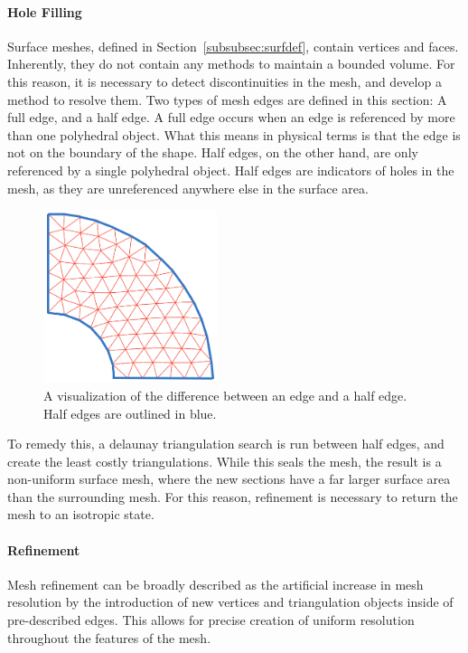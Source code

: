 \documentclass[12pt]{drexelthesis}
\begin{document}
\paragraph{Hole Filling}
Surface meshes, defined in Section~\ref{subsubsec:surfdef}, contain vertices and faces. Inherently, they do not contain any methods to maintain a bounded volume. For this reason, it is necessary to detect discontinuities in the mesh, and develop a method to resolve them. Two types of mesh edges are defined in this section: A full edge, and a half edge.
A full edge occurs when an edge is referenced by more than one polyhedral object. What this means in physical terms is that the edge is not on the boundary of the shape. Half edges, on the other hand, are only referenced by a single polyhedral object. Half edges are indicators of holes in the mesh, as they are unreferenced anywhere else in the surface area.

\begin{figure}[!ht]
	\centering
		\includegraphics[width=2in]{edgevshalfedge.png}
		\caption[Example of an edge vs. a half edge]{\centering A visualization of the difference between an edge and a half edge. Half edges are outlined in blue.}
\end{figure}

To remedy this, a delaunay triangulation search is run between half edges, and create the least costly triangulations. While this seals the mesh, the result is a non-uniform surface mesh, where the new sections have a far larger surface area than the surrounding mesh. For this reason, refinement is necessary to return the mesh to an isotropic state.

\paragraph{Refinement}
Mesh refinement can be broadly described as the artificial increase in mesh resolution by the introduction of new vertices and triangulation objects inside of pre-described edges. This allows for precise creation of uniform resolution throughout the features of the mesh.
\end{document}
